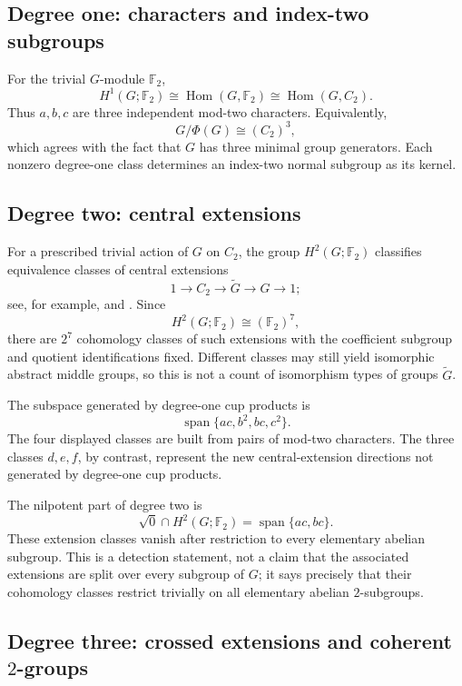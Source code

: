 \documentclass[11pt]{amsart}
\theoremstyle{definition}
\theoremstyle{remark}
\DeclareMathOperator{\Span}{span}
\DeclareMathOperator{\Hom}{Hom}
\newcommand{\F}{\mathbb F}
\newcommand{\Nrad}{\sqrt{0}}
\begin{document}
\subsection{Degree one: characters and index-two subgroups}

For the trivial \(G\)-module \(\F_2\),
\[
H^1(G;\F_2)\cong\Hom(G,\F_2)
              \cong\Hom(G,C_2).
\]
Thus \(a,b,c\) are three independent mod-two characters.  Equivalently,
\[
G/\Phi(G)\cong(C_2)^3,
\]
which agrees with the fact that \(G\) has three minimal group generators.  Each nonzero degree-one class determines an index-two normal subgroup as its kernel.

\subsection{Degree two: central extensions}

For a prescribed trivial action of \(G\) on \(C_2\), the group \(H^2(G;\F_2)\) classifies equivalence classes of central extensions
\begin{equation}
\label{eq:central-extension}
1\longrightarrow C_2\longrightarrow \widetilde G
\longrightarrow G\longrightarrow1;
\end{equation}
see, for example, \cite[Chapter~IV]{Brown1982} and \cite{AdemMilgram}.  Since
\[
H^2(G;\F_2)\cong(\F_2)^7,
\]
there are \(2^7\) cohomology classes of such extensions with the coefficient subgroup and quotient identifications fixed.  Different classes may still yield isomorphic abstract middle groups, so this is not a count of isomorphism types of groups \(\widetilde G\).

The subspace generated by degree-one cup products is
\[
\Span\{ac,b^2,bc,c^2\}.
\]
The four displayed classes are built from pairs of mod-two characters.  The three classes \(d,e,f\), by contrast, represent the new central-extension directions not generated by degree-one cup products.

The nilpotent part of degree two is
\[
\Nrad\cap H^2(G;\F_2)=\Span\{ac,bc\}.
\]
These extension classes vanish after restriction to every elementary abelian subgroup.  This is a detection statement, not a claim that the associated extensions are split over every subgroup of \(G\); it says precisely that their cohomology classes restrict trivially on all elementary abelian \(2\)-subgroups.

\subsection{Degree three: crossed extensions and coherent \texorpdfstring{\(2\)}{2}-groups}
\end{document}
